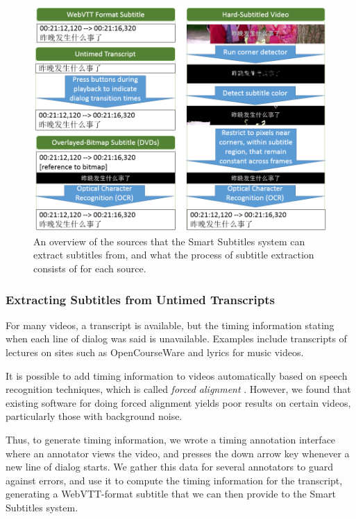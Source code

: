 \documentclass{sigchi}
\begin{document}
\begin{figure}[!h]
\centering
\includegraphics[width=\columnwidth]{subtitle-sources}
\caption{An overview of the sources that the Smart Subtitles system can extract subtitles from, and what the process of subtitle extraction consists of for each source.}
\label{fig:figure3}
\end{figure}

\subsubsection{Extracting Subtitles from Untimed Transcripts}

For many videos, a transcript is available, but the timing information
stating when each line of dialog was said is unavailable.
Examples include transcripts of lectures on sites such as
OpenCourseWare and lyrics for music videos.

It is possible to add timing information to videos automatically based on speech recognition techniques, which is called \emph{forced alignment} \cite{sailalign}.
However, we found that existing software for doing forced alignment
yields poor results on certain videos, particularly those with background
noise.

Thus, to generate timing information,
we wrote a timing annotation interface where an annotator
views the video, and presses the down arrow key whenever a new
line of dialog starts.
We gather this data for several annotators to guard against errors,
and use it to compute the timing information for the transcript,
generating a WebVTT-format subtitle that we can then provide to the Smart Subtitles system.
\end{document}
